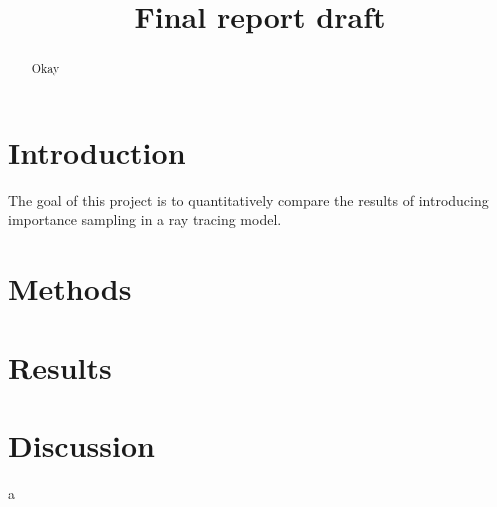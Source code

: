 \documentclass[12pt]{article}
\title{Final report draft}
\begin{document}
\maketitle
\begin{abstract}
Okay
\end{abstract}
\section{Introduction}
	The goal of this project is to quantitatively compare the results of introducing importance sampling in a ray tracing model.
    
\section{Methods}

\section{Results}

\section{Discussion}
a
\end{document}
